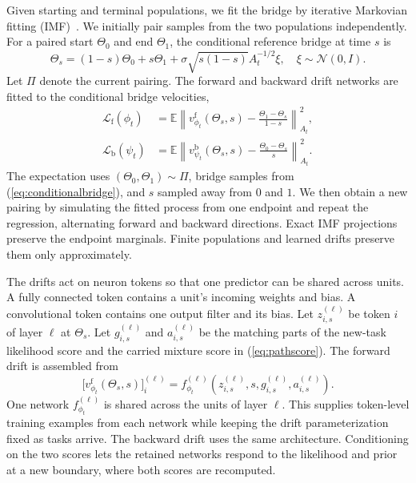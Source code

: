 Given starting and terminal populations, we fit the bridge by iterative
Markovian fitting (IMF)~\cite{shi2023dsbm}. We initially pair samples from
the two populations independently. For a paired start $\Theta_0$ and end
$\Theta_1$, the conditional reference bridge at time $s$ is
\begin{equation}
    \Theta_s=(1-s)\Theta_0+s\Theta_1+
    \sigma\sqrt{s(1-s)}A_t^{-1/2}\xi,
    \quad \xi\sim\mathcal{N}(0,I).
    \label{eq:conditionalbridge}
\end{equation}
Let $\Pi$ denote the current pairing. The forward and backward drift
networks are fitted to the conditional bridge velocities,
\begin{align}
    \mathcal{L}_{\mathrm f}(\phi_t)
    &=\mathbb{E}\left\|v^{\mathrm f}_{\phi_t}(\Theta_s,s)
    -\frac{\Theta_1-\Theta_s}{1-s}\right\|_{A_t}^{2},
    \label{eq:lossf}\\
    \mathcal{L}_{\mathrm b}(\psi_t)
    &=\mathbb{E}\left\|v^{\mathrm b}_{\psi_t}(\Theta_s,s)
    -\frac{\Theta_0-\Theta_s}{s}\right\|_{A_t}^{2}.
    \label{eq:lossb}
\end{align}
The expectation uses $(\Theta_0,\Theta_1)\sim\Pi$, bridge samples from
(\ref{eq:conditionalbridge}), and $s$ sampled away from $0$ and $1$.
We then obtain a new pairing by simulating the fitted process from one
endpoint and repeat the regression, alternating forward and backward
directions. Exact IMF projections preserve the endpoint marginals. Finite
populations and learned drifts preserve them only approximately.

The drifts act on neuron tokens so that one predictor can be shared across
units. A fully connected token contains a unit's incoming weights and bias.
A convolutional token contains one output filter and its bias. Let
$z_{i,s}^{(\ell)}$ be token $i$ of layer $\ell$ at $\Theta_s$. Let
$g_{i,s}^{(\ell)}$ and $a_{i,s}^{(\ell)}$ be the matching parts of the
new-task likelihood score and the carried mixture score in
(\ref{eq:pathscore}). The forward drift is assembled from
\begin{equation}
    \big[v^{\mathrm f}_{\phi_t}(\Theta_s,s)\big]_i^{(\ell)}
    =f_{\phi_t}^{(\ell)}\!\left(
    z_{i,s}^{(\ell)},s,g_{i,s}^{(\ell)},a_{i,s}^{(\ell)}\right).
    \label{eq:tokendrift}
\end{equation}
One network $f_{\phi_t}^{(\ell)}$ is shared across the units of layer
$\ell$. This supplies token-level training examples from each network
while keeping the drift parameterization fixed as tasks arrive. The
backward drift uses the same architecture. Conditioning on the two scores
lets the retained networks respond to the likelihood and prior at a new
boundary, where both scores are recomputed.

